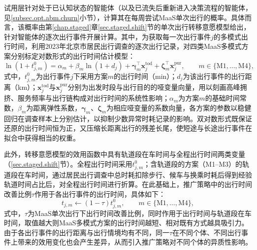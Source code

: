 试用层针对处于已认知状态的智能体（以及已流失后重新进入决策流程的智能体，见\ref{subsec.opt.abm.churn}小节），计算其在每周尝试MaaS单次出行的概率。具体而言，该概率由第\ref{chap.staged}章\ref{sec.staged.shift}节的单次出行转移意愿模型给出，针对智能体的逐次出行事件开展计算。其中，为获取每一次出行事件$j$的多模式出行时间，利用2023年北京市居民出行调查的逐次出行记录，对四类MaaS多模式方案分别标定对数形式的出行时间估计模型：
\begin{equation}
\ln\left(1+t_{j,m}^{0}\right)=\alpha_{m}+\beta_{m}\ln\left(1+d_{j}\right)+\bm{\gamma}_{m}^{\top}\bm{x}_{j}^{\mathrm{tod}}+\bm{\zeta}_{m}^{\top}\bm{x}_{j}^{\mathrm{pur}},\qquad m\in\{\mathrm{M1},\dots,\mathrm{M4}\},
\label{eq.opt.traveltime}
\end{equation}
式中，$t_{j,m}^{0}$为出行事件$j$下采用方案$m$的出行时间（min）；$d_{j}$为该出行事件的出行距离（km）；$\bm{x}_{j}^{\mathrm{tod}}$与$\bm{x}_{j}^{\mathrm{pur}}$分别为出发时段与出行目的的哑变量向量，用以刻画高峰拥挤、服务频率与出行链构成对出行时间的系统性影响；$\alpha_{m}$为方案$m$的基础时间常数，$\beta_{m}$为距离弹性系数，$\bm{\gamma}_{m}$、$\bm{\zeta}_{m}$为相应哑变量的系数向量，各方案的参数以稳健回归在调查样本上分别估计，以抑制少数异常时耗记录的影响。双对数形式既保证还原的出行时间恒为正，又压缩长距离出行的残差长尾，使短途与长途出行事件在拟合中获得相当的权重。

此外，转移意愿模型的效用函数中具有轨道段在车时间与全程出行时间两类变量（\ref{sec.staged.shift}节）。全程出行时间采用$t_{j,m}^{0}$；含轨道段的方案（M1--M3）的轨道段在车时间，通过居民出行调查中总时耗扣除步行、候车与换乘时耗后得到经验轨道时间占比后，对全程出行时间进行折算。在此基础上，推广策略中的出行时间改善比例$\tau$作用于各出行事件的出行时间，具体如下：
\begin{equation}
t_{j,m} \leftarrow \left(1-\tau\right)t_{j,m}^{0},\qquad m\in\{\mathrm{M1},\dots,\mathrm{M4}\},
\label{eq.opt.trychannel}
\end{equation}
式中，$\tau$为MaaS单次出行下出行时间改善比例，同时作用于出行时间与轨道段在车时间，取值越大则MaaS多模式方案的出行时间越短、相对既有方式越具吸引力。由于各出行事件的出行距离与出行情境均有不同，同一$\tau$在不同个体、不同出行事件上带来的效用变化也会产生差异，从而引入推广策略对不同个体的异质性影响。

